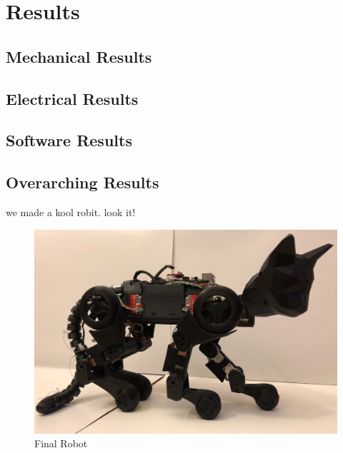 \section{Results}
\subsection{Mechanical Results}

\subsection{Electrical Results}

\subsection{Software Results}

\subsection{Overarching Results}
we made a kool robit. look it!
\begin{figure}[H]
            \centering
            \includegraphics[width=120mm]{figures/FinalRobot.jpg}
            \caption{Final Robot}
            \label{fig:FinalRobot}
        \end{figure}
